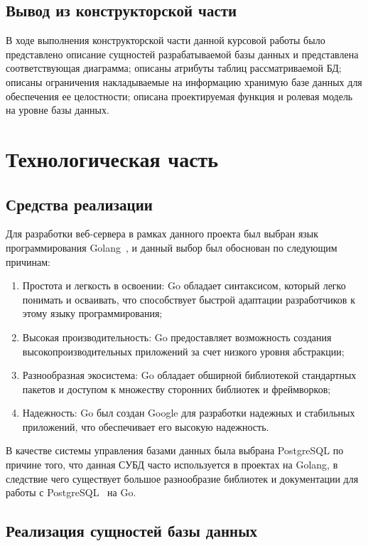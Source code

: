 \documentclass{bmstu}
\begin{document}
\section*{Вывод из конструкторской части}

В ходе выполнения конструкторской части данной курсовой работы было представлено описание сущностей разрабатываемой базы данных и представлена соответствующая диаграмма; описаны атрибуты таблиц рассматриваемой БД; описаны ограничения накладываемые на информацию хранимую базе данных для обеспечения ее целостности; описана проектируемая функция и ролевая модель на уровне базы данных.

\chapter{Технологическая часть}

\section{Средства реализации}

Для разработки веб-сервера в рамках данного проекта был выбран язык программирования Golang~\cite{Go}, и данный выбор был обоснован по следующим причинам:

\begin{enumerate}
	\item Простота и легкость в освоении: Go обладает синтаксисом, который легко понимать и осваивать, что способствует быстрой адаптации разработчиков к этому языку программирования;
	\item Высокая производительность: Go предоставляет возможность создания высокопроизводительных приложений за счет низкого уровня абстракции;
	\item Разнообразная экосистема: Go обладает обширной библиотекой стандартных пакетов и доступом к множеству сторонних библиотек и фреймворков;
	\item Надежность: Go был создан Google для разработки надежных и стабильных приложений, что обеспечивает его высокую надежность.
\end{enumerate}

В качестве системы управления базами данных была выбрана PostgreSQL по причине того, что данная СУБД часто используется в проектах на Golang, в следствие чего существует большое разнообразие библиотек и документации для работы с PostgreSQL~\cite{Postgres} на Go.

\pagebreak

\section{Реализация сущностей базы данных}
\end{document}
